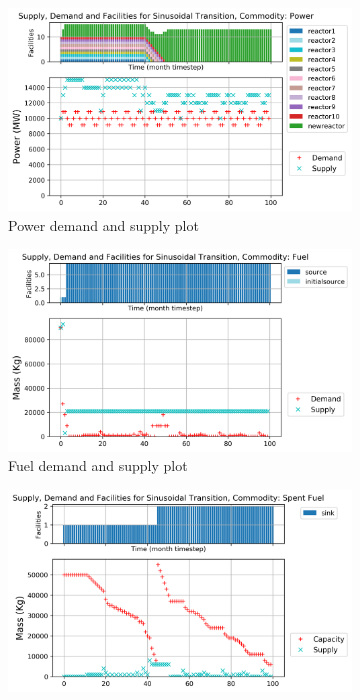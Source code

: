 \documentclass{anstrans}
\begin{document}
\begin{figure}[!htbp]
    \centering
    \begin{subfigure}[t]{\textwidth}
    \centering
        \includegraphics[width=0.9\linewidth]{figures/sinetransition-power.png} 
        \caption{Power demand and supply plot}
        \label{fig:sinetransition-power}
    \end{subfigure}
    \vspace{1cm}
    \begin{subfigure}[t]{0.45\textwidth}
        \centering
        \includegraphics[width=\linewidth]{figures/sinetransition-fuel.png} 
        \caption{Fuel demand and supply plot}
	    \label{fig:sinetransition-fuel}
    \end{subfigure}
    \hfill
    \begin{subfigure}[t]{0.45\textwidth}
        \centering
        \includegraphics[width=\linewidth]{figures/sinetransition-spentfuel.png} 

\end{subfigure}
\end{figure}
\end{document}
